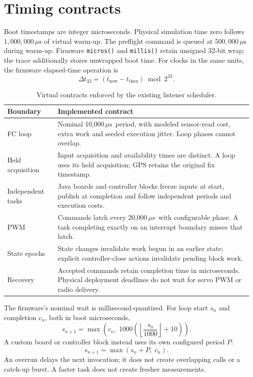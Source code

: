 \documentclass[10pt,letterpaper]{article}
\newcommand{\code}[1]{\nolinkurl{#1}}
\newcommand{\us}{\ensuremath{\,\mu\mathrm{s}}}
\begin{document}
\clearpage
\section{Timing contracts}
Boot timestamps are integer microseconds. Physical simulation time zero
follows \(1{,}000{,}000\us\) of virtual warm-up. The preflight command is queued
at \(500{,}000\us\) during warm-up. Firmware \code{micros()} and \code{millis()}
retain unsigned 32-bit wrap; the trace additionally stores unwrapped boot time.
For clocks in the same units, the firmware elapsed-time operation is
\begin{equation}
 \Delta t_{32}=(t_{\mathrm{now}}-t_{\mathrm{then}})\bmod 2^{32}.
\end{equation}

\begin{table}[htbp]\centering\small
\begin{tabularx}{\linewidth}{@{}p{3.1cm}Y@{}}\toprule
Boundary & Implemented contract\\\midrule
FC loop & Nominal 10,000\us\ period, with modeled sensor-read cost, extra work and seeded execution jitter. Loop phases cannot overlap.\\
Held acquisition & Input acquisition and availability times are distinct. A loop uses its held acquisition; GPS retains the original fix timestamp.\\
Independent tasks & Java boards and controller blocks freeze inputs at start, publish at completion and follow independent periods and execution costs.\\
PWM & Commands latch every 20,000\us\ with configurable phase. A task completing exactly on an interrupt boundary misses that latch.\\
State epochs & State changes invalidate work begun in an earlier state; explicit controller-close actions invalidate pending block work.\\
Recovery & Accepted commands retain completion time in microseconds. Physical deployment deadlines do not wait for servo PWM or radio delivery.\\
\bottomrule\end{tabularx}
\caption{Virtual contracts enforced by the existing listener scheduler.}
\end{table}

The firmware's nominal wait is millisecond-quantized. For loop start \(s_n\)
and completion \(c_n\), both in boot microseconds,
\begin{equation}
 s_{n+1}=\max\!\left(c_n,\;1000\left(\left\lfloor\frac{s_n}{1000}\right\rfloor+10\right)\right).
\end{equation}
A custom board or controller block instead uses its own configured period
\(P\):
\begin{equation}
 s_{n+1}=\max(s_n+P,\;c_n).
\end{equation}
An overrun delays the next invocation; it does not create overlapping calls
or a catch-up burst. A faster task does not create fresher measurements.
\end{document}

